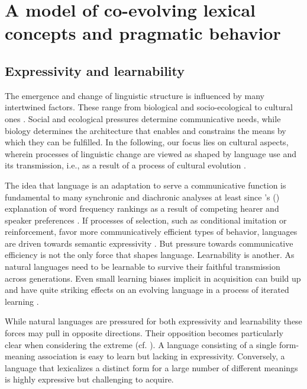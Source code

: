 \documentclass[a4paper, 11pt]{article}
\newcommand{\citeposs}[2][]{\citeauthor{#2}'s (\citeyear[#1]{#2})}
\begin{document}
\section{A model of co-evolving lexical concepts and pragmatic behavior}
\label{sec:model}

\subsection{Expressivity and learnability}

The emergence and change of linguistic structure is influenced by many intertwined
factors. These range from biological and socio-ecological to cultural ones \citep{benz+etal:2005b,steels:2011,tamariz+kirby:2016}. Social and ecological pressures determine communicative needs, while
biology determines the architecture that enables and constrains the means by which they can be
fulfilled. In the following, our focus lies on cultural aspects, wherein processes of
linguistic change are viewed as shaped by language use and its transmission, i.e., as a result
of a process of cultural evolution
\citep{Pagel2009:Human-Language-,ThompsonKirby2016:Culture-Shapes-}.

The idea that language is an adaptation to serve a communicative function is fundamental to
many synchronic and diachronic analyses at least since \citeposs{zipf:1949} explanation of word
frequency rankings as a result of competing hearer and speaker preferences \citep[e.g.,
in][]{martinet:1962, horn:1984,jaeger+vRooij:2007,jaeger:2007,
  piantadosi:2014,kirby+etal:2015}. If processes of selection, such as conditional imitation or
reinforcement, favor more communicatively efficient types of behavior, languages are driven
towards semantic expressivity \citep[e.g.,][]{nowak+krakauer:1999,Skyrms2010:Signals}. But
pressure towards communicative efficiency is not the only force that shapes
language. Learnability is another. As natural languages need to be learnable to survive their
faithful transmission across generations. Even small learning biases implicit in acquisition
can build up and have quite striking effects on an evolving language in a process of iterated
learning
\citep{KirbyHurford2002:The-Emergence-o,SmithKirby2003:Iterated-Learni,kirby+etal:2014}.

While natural languages are pressured for both expressivity and learnability these forces may
pull in opposite directions. Their opposition becomes particularly clear when considering the
extreme (cf. \citealt{kemp+regier:2012,kirby+etal:2015}). A language consisting of a single
form-meaning association is easy to learn but lacking in expressivity. Conversely, a language
that lexicalizes a distinct form for a large number of different meanings is highly expressive
but challenging to acquire.
\end{document}
